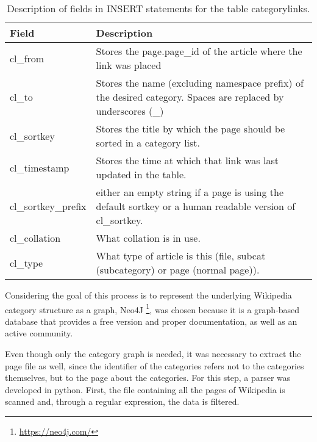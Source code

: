 \begin{table}[H]
\begin{adjustbox}{width=1\textwidth}
\begin{tabular}{@{}ll@{}}
\toprule
Field               & Description                                                                                                   \\ \midrule
cl\_from            & Stores the page.page\_id of the article where the link was placed                                             \\
cl\_to              & Stores the name (excluding namespace prefix) of the desired category. Spaces are replaced by underscores (\_) \\
cl\_sortkey         & Stores the title by which the page should be sorted in a category list.                                       \\
cl\_timestamp       & Stores the time at which that link was last updated in the table.                                             \\
cl\_sortkey\_prefix & either an empty string if a page is using the default sortkey or a human readable version of cl\_sortkey.     \\
cl\_collation       & What collation is in use.                                                                                    \\
cl\_type            & What type of article is this (file, subcat (subcategory) or page (normal page)).                              \\ \bottomrule
\end{tabular}
\end{adjustbox}
\caption{Description of fields in INSERT statements for the table categorylinks.}
\label{tab:categorylinks}
\end{table}

Considering the goal of this process is to represent the underlying Wikipedia category structure as a graph, Neo4J \footnote {\url{https://neo4j.com/}}, was chosen because it is a graph-based database that provides a free version and proper documentation, as well as an active community. 

Even though only the category graph is needed, it was necessary to extract the page file as well, since the identifier of the categories refers not to the categories themselves, but to the page about the categories. For this step, a parser was developed in python. First, the file containing all the pages of Wikipedia is scanned and, through a regular expression, the data is filtered.

